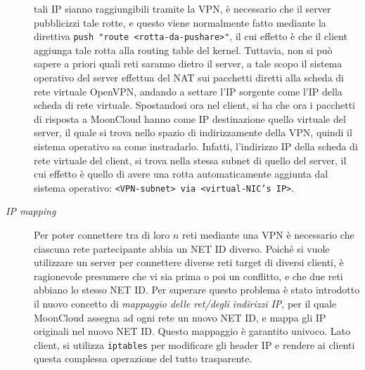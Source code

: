 \begin{description}
  tali IP sianno raggiungibili tramite la VPN, è necessario che il server
  pubblicizzi tale rotte, e questo viene normalmente fatto mediante la direttiva
  \texttt{push "route <rotta-da-pushare>"}, il cui effetto è che il client aggiunga
  tale rotta alla routing table del kernel. Tuttavia, non si può sapere a priori
  quali reti saranno dietro il server, a tale scopo il sistema operativo del server
  effettua del NAT sui pacchetti diretti alla scheda di rete virtuale OpenVPN,
  andando a settare l'IP sorgente come l'IP della scheda di rete virtuale. Spostandosi ora
  nel client, si ha che ora i pacchetti di risposta a MoonCloud hanno come IP destinazione
  quello virtuale del server, il quale si trova nello spazio di indirizzamente della
  VPN, quindi il sistema operativo sa come instradarlo. Infatti, l'indirizzo IP
  della scheda di rete virtuale del client, si trova nella stessa subnet di quello
  del server, il cui effetto è quello di avere una rotta automaticamente aggiunta
  dal sistema operativo: \texttt{<VPN-subnet> via <virtual-NIC's IP>}.
  \item[\textit{IP mapping}]Per poter connettere tra di loro $n$ reti mediante
  una VPN è necessario che ciascuna rete partecipante abbia un NET ID diverso. Poiché
  si vuole utilizzare un server per connettere diverse reti target di diversi clienti,
  è ragionevole presumere che vi sia prima o poi un conflitto, e che due reti abbiano
  lo stesso NET ID. Per superare questo problema è stato introdotto il nuovo concetto
  di \textit{mappaggio delle ret/degli indirizzi IP}, per il quale MoonCloud assegna
  ad ogni rete un nuovo NET ID, e mappa gli IP originali nel nuovo NET ID. Questo
  mappaggio è garantito univoco. Lato client, si utilizza \texttt{iptables} per
  modificare gli header IP e rendere ai clienti questa complessa operazione del tutto
  trasparente.
\end{description}
